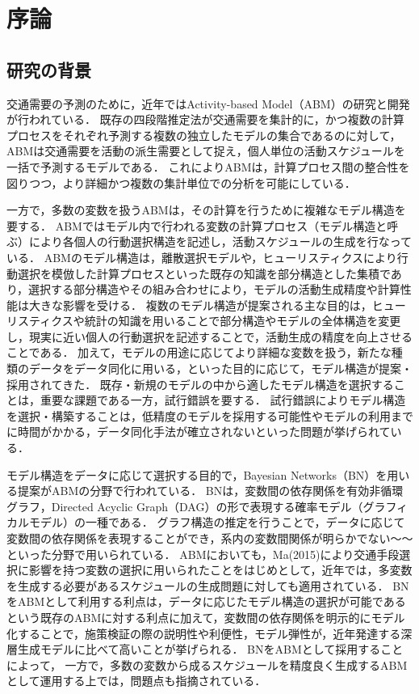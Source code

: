 \chapter{序論} 
\label{1}
\section{研究の背景}\label{1.1}
交通需要の予測のために，近年ではActivity-based Model（ABM）の研究と開発が行われている．
既存の四段階推定法が交通需要を集計的に，かつ複数の計算プロセスをそれぞれ予測する複数の独立したモデルの集合であるのに対して，ABMは交通需要を活動の派生需要として捉え，個人単位の活動スケジュールを一括で予測するモデルである\cite{Xiang1997}．
これによりABMは，計算プロセス間の整合性を図りつつ\cite{Xiang1997}，より詳細かつ複数の集計単位での分析を可能にしている．

一方で，多数の変数を扱うABMは，その計算を行うために複雑なモデル構造を要する．
ABMではモデル内で行われる変数の計算プロセス（モデル構造と呼ぶ）により各個人の行動選択構造を記述し，活動スケジュールの生成を行なっている．
ABMのモデル構造は，離散選択モデルや，ヒューリスティクスにより行動選択を模倣した計算プロセスといった既存の知識を部分構造とした集積であり\cite{Xiang1997}，選択する部分構造やその組み合わせにより，モデルの活動生成精度や計算性能は大きな影響を受ける．
複数のモデル構造が提案される主な目的は，ヒューリスティクスや統計の知識を用いることで部分構造やモデルの全体構造を変更し，現実に近い個人の行動選択を記述することで，活動生成の精度を向上させることである\cite{Xiang1997}．
加えて，モデルの用途に応じてより詳細な変数を扱う\cite{Xiang1997}，新たな種類のデータをデータ同化に用いる\cite{Xiang1997}，といった目的に応じて，モデル構造が提案・採用されてきた．
既存・新規のモデルの中から適したモデル構造を選択することは，重要な課題である一方，試行錯誤を要する．
試行錯誤によりモデル構造を選択・構築することは，低精度のモデルを採用する可能性やモデルの利用までに時間がかかる，データ同化手法が確立されないといった問題が挙げられている\cite{Xiang1997}．

モデル構造をデータに応じて選択する目的で，Bayesian Networks（BN）を用いる提案がABMの分野で行われている．
BNは，変数間の依存関係を有効非循環グラフ，Directed Acyclic Graph（DAG）の形で表現する確率モデル（グラフィカルモデル）の一種である．
グラフ構造の推定を行うことで，データに応じて変数間の依存関係を表現することができ，系内の変数間関係が明らかでない〜〜といった分野で用いられている\cite{Xiang1997}．
ABMにおいても，Ma(2015)\cite{Xiang1997}により交通手段選択に影響を持つ変数の選択に用いられたことをはじめとして，近年では，多変数を生成する必要があるスケジュールの生成問題\cite{Xiang1997}に対しても適用されている．
BNをABMとして利用する利点は，データに応じたモデル構造の選択が可能であるという既存のABMに対する利点に加えて，変数間の依存関係を明示的にモデル化することで，施策検証の際の説明性や利便性，モデル弾性が，近年発達する深層生成モデルに比べて高いことが挙げられる\cite{Xiang1997}．
BNをABMとして採用することによって，
一方で，多数の変数から成るスケジュールを精度良く生成するABMとして運用する上では，問題点も指摘されている．


